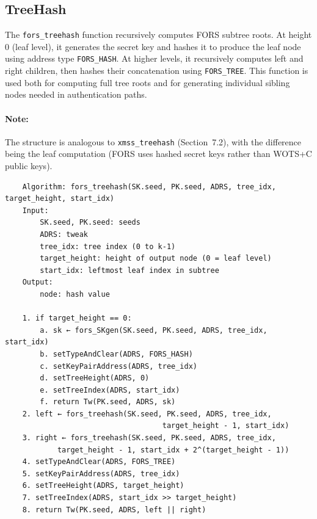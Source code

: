 \subsection{TreeHash}
The \texttt{fors\_treehash} function recursively computes FORS subtree roots. At height 0 (leaf level), it generates the secret key and hashes it to produce the leaf node using address type \texttt{FORS\_HASH}. At higher levels, it recursively computes left and right children, then hashes their concatenation using \texttt{FORS\_TREE}. This function is used both for computing full tree roots and for generating individual sibling nodes needed in authentication paths.

\paragraph{Note:} The structure is analogous to \texttt{xmss\_treehash} (Section~7.2), with the difference being the leaf computation (FORS uses hashed secret keys rather than WOTS+C public keys).
\begin{verbatim}
    Algorithm: fors_treehash(SK.seed, PK.seed, ADRS, tree_idx, target_height, start_idx)
    Input:
        SK.seed, PK.seed: seeds
        ADRS: tweak
        tree_idx: tree index (0 to k-1)
        target_height: height of output node (0 = leaf level)
        start_idx: leftmost leaf index in subtree
    Output:
        node: hash value

    1. if target_height == 0:
        a. sk ← fors_SKgen(SK.seed, PK.seed, ADRS, tree_idx, start_idx)
        b. setTypeAndClear(ADRS, FORS_HASH)
        c. setKeyPairAddress(ADRS, tree_idx)
        d. setTreeHeight(ADRS, 0)
        e. setTreeIndex(ADRS, start_idx)
        f. return Tw(PK.seed, ADRS, sk)
    2. left ← fors_treehash(SK.seed, PK.seed, ADRS, tree_idx, 
                                    target_height - 1, start_idx)
    3. right ← fors_treehash(SK.seed, PK.seed, ADRS, tree_idx, 
            target_height - 1, start_idx + 2^(target_height - 1))
    4. setTypeAndClear(ADRS, FORS_TREE)
    5. setKeyPairAddress(ADRS, tree_idx)
    6. setTreeHeight(ADRS, target_height)
    7. setTreeIndex(ADRS, start_idx >> target_height)
    8. return Tw(PK.seed, ADRS, left || right)
\end{verbatim}

